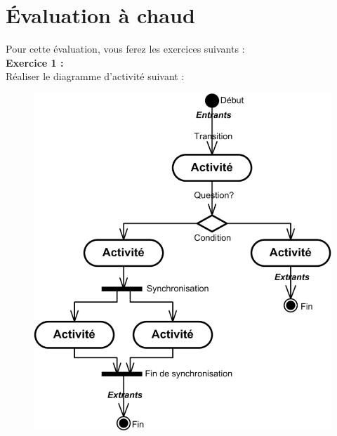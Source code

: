 \documentclass[asi, sansVersion]{picInsa}
\begin{document}
	\newpage
	\section*{Évaluation à chaud}
		Pour cette évaluation, vous ferez les exercices suivants : 
		\\
		
		\textbf{Exercice 1 :}\\
		Réaliser le diagramme d'activité suivant : \\
		\begin{figure}[H]
			\centering
			\includegraphics[scale=0.5]{images/diagrammeDActivite.png}
		\end{figure}			
		
\end{document}
